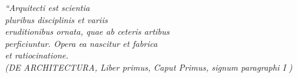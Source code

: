 \begin{epigrafe}
    \vspace*{\fill}
	\begin{flushright}
		\textit{``Arquitecti est scientia \\
    pluribus disciplinis et variis \\
    eruditionibus ornata, quae ab ceteris artibus \\
    perficiuntur. Opera ea nascitur et fabrica \\
    et ratiocinatione. \\
		(DE ARCHITECTURA, Liber primus, Caput Primus, signum paragraphi I )}
	\end{flushright}
\end{epigrafe}
\newpage

